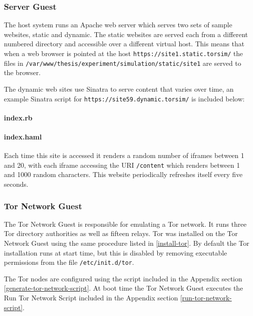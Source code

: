 \subsubsection{Server Guest}

The host system runs an Apache web server which serves two sets of sample
websites, static and dynamic. The static websites are served each from a
different numbered directory and accessible over a different virtual host. This
means that when a web browser is pointed at the host
\verb+https://site1.static.torsim/+ the files in
\verb+/var/www/thesis/experiment/simulation/static/site1+ are served to the
browser.

The dynamic web sites use Sinatra to serve content that varies over time, an
example Sinatra script for \verb+https://site59.dynamic.torsim/+ is included
below:

\paragraph{index.rb}


\paragraph{index.haml}


Each time this site is accessed it renders a random number of iframes between 1
and 20, with each iframe accessing the URI \verb+/content+ which renders between
1 and 1000 random characters. This website periodically refreshes itself every
five seconds.

\subsubsection{Tor Network Guest}

The Tor Network Guest is responsible for emulating a Tor network. It runs three
Tor directory authorities as well as fifteen relays. Tor was installed on the
Tor Network Guest using the same procedure listed in \ref{install-tor}. By
default the Tor installation runs at start time, but this is disabled by
removing executable permissions from the file \verb+/etc/init.d/tor+.

The Tor nodes are configured using the script included in the Appendix section
\ref{generate-tor-network-script}. At boot time the Tor Network Guest executes
the Run Tor Network Script included in the Appendix section
\ref{run-tor-network-script}.

